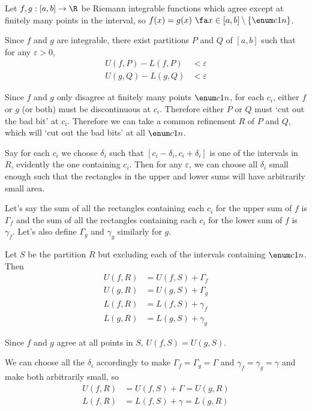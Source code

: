 \documentclass[a4paper]{article}
\begin{document}

Let $f, g : [a, b] \to \R$ be Riemann integrable functions which agree except at finitely many points in the interval, so $f(x) = g(x) \ \fa x \in [a,b] \setminus \{\enum c1n\}$.


Since $f$ and $g$ are integrable, there exist partitions $P$ and $Q$ of $[a,b]$ such that for any $\varepsilon > 0$, \begin{align*}
U(f, P) - L(f, P) &< \varepsilon\\
U(g, Q) - L(g, Q) &< \varepsilon
\end{align*}

Since $f$ and $g$ only disagree at finitely many points $\enum c1n$, for each $c_i$, either $f$ or $g$ (or both) must be discontinuous at $c_i$. Therefore either $P$ or $Q$ must \enquote*{cut out the bad bit} at $c_i$. Therefore we can take a common refinement $R$ of $P$ and $Q$, which will \enquote*{cut out the bad bits} at all $\enum c1n$.

Say for each $c_i$ we choose $\delta_i$ such that $[c_i - \delta_i, c_i + \delta_i]$ is one of the intervals in $R$, evidently the one containing $c_i$. Then for any $\varepsilon$, we can choose all $\delta_i$ small enough such that the rectangles in the upper and lower sums will have arbitrarily small area.

Let's say the sum of all the rectangles containing each $c_i$ for the upper sum of $f$ is $\Gamma_f$ and the sum of all the rectangles containing each $c_i$ for the lower sum of $f$ is $\gamma_f$. Let's also define $\Gamma_g$ and $\gamma_g$ similarly for $g$.

Let $S$ be the partition $R$ but excluding each of the intervals containing $\enum c1n$. Then \begin{align*}
U(f, R) &= U(f, S) + \Gamma_f\\
U(g, R) &= U(g, S) + \Gamma_g\\
L(f, R) &= L(f, S) + \gamma_f\\
L(g, R) &= L(g, S) + \gamma_g
\end{align*}

Since $f$ and $g$ agree at all points in $S$, $U(f, S) = U(g, S)$.

We can choose all the $\delta_i$ accordingly to make $\Gamma_f = \Gamma_g = \Gamma$ and $\gamma_f = \gamma_g = \gamma$ and make both arbitrarily small, so \begin{align*}
U(f, R) &= U(f, S) + \Gamma = U(g, R)\\
L(f, R) &= L(f, S) + \gamma = L(g, R)
\end{align*}
\end{document}
